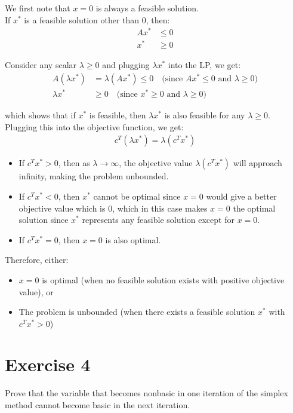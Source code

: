 \documentclass{article}
\begin{document}
We first note that $x = 0$ is always a feasible solution. \\

If $x^*$ is a feasible solution other than 0, then:
\begin{align*}
Ax^* &\leq 0 \\
x^* &\geq 0
\end{align*}

Consider any scalar $\lambda \geq 0$ and plugging $\lambda x^*$ into the LP, we get:
\begin{align*}
A(\lambda x^*) &= \lambda(Ax^*) \leq 0 \quad \text{(since $Ax^* \leq 0$ and $\lambda \geq 0$)} \\
\lambda x^* &\geq 0 \quad \text{(since $x^* \geq 0$ and $\lambda \geq 0$)}
\end{align*}

which shows that if $x^*$ is feasible, then $\lambda x^*$ is also feasible for any $\lambda \geq 0$. \\

Plugging this into the objective function, we get:
\begin{align*}
c^T(\lambda x^*) = \lambda(c^T x^*)
\end{align*}

\begin{itemize}
\item If $c^T x^* > 0$, then as $\lambda \to \infty$, the objective value $\lambda(c^T x^*)$ will approach infinity, making the problem unbounded.
\item If $c^T x^* < 0$, then $x^*$ cannot be optimal since $x = 0$ would give a better objective value which is 0, which in this case makes $x = 0$ the optimal solution since $x^*$ represents any feasible solution except for $x = 0$.
\item If $c^T x^* = 0$, then $x = 0$ is also optimal.
\end{itemize}

Therefore, either:
\begin{itemize}
\item $x = 0$ is optimal (when no feasible solution exists with positive objective value), or
\item The problem is unbounded (when there exists a feasible solution $x^*$ with $c^T x^* > 0$)
\end{itemize}

\newpage

\section*{Exercise 4}
Prove that the variable that becomes nonbasic in one iteration of the simplex method cannot become basic in the next iteration. \\
\end{document}
